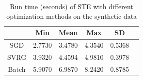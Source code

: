 \documentclass[letterpaper]{article}
\begin{document}
		\begin{table}[ht]
			\centering
			\begin{tabular}{c||c c c c c }
				\hline
						& Min 	 & Mean 	& Max 		& SD 		\\ \hline \hline
				SGD 	& 2.7730 & 3.4780 	& 4.3540 	& 0.5368 	\\  \hline
				SVRG 	& 3.9320 & 4.4594 	& 4.9810 	& 0.3978 	\\  \hline
				Batch 	& 5.9070 & 6.9870 	& 8.2420 	& 0.8785 	\\  \hline
			\end{tabular}
			\caption{Run time (seconds) of STE with different optimization methods on the synthetic data}\label{tab_2}
		\end{table}
\end{document}
